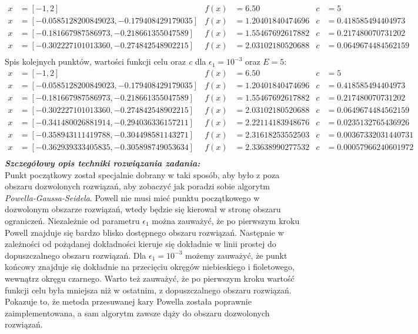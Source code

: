 \documentclass[a4paper,12pt]{article}
\begin{document}
\begin{align*}
x &= [-1, 2] & 
f(x) &= 6.50 &
c &= 5 \\
x &= [-0.0585128200849023, -0.179408429179035] & 
f(x) &= 1.20401840474696 &
c &= 0.418585494404973 \\
x &= [-0.181667987586973, -0.218661355047589] & 
f(x) &= 1.55467692617882 &
c &= 0.217480070731202 \\
x &= [-0.302227101013360, -0.274842548902215] & 
f(x) &= 2.03102180520688 &
c &= 0.0649674484562159 \\
\end{align*}
Spis kolejnych punktów, wartości funkcji celu oraz \textit{c}  dla $\epsilon_{1} = 10^{-3}$ oraz $E = 5$:
\begin{align*}
x &= [-1, 2] & 
f(x) &= 6.50 &
c &= 5 \\
x &= [-0.0585128200849023, -0.179408429179035] & 
f(x) &= 1.20401840474696 &
c &= 0.418585494404973 \\
x &= [-0.181667987586973, -0.218661355047589] & 
f(x) &= 1.55467692617882 &
c &= 0.217480070731202 \\
x &= [-0.302227101013360, -0.274842548902215] & 
f(x) &= 2.03102180520688 &
c &= 0.0649674484562159 \\
x &= [-0.341480026881914, -0.294036336157211] & 
f(x) &= 2.22114183948676 &
c &= 0.0235132765436926 \\
x &= [-0.358943111419788, -0.304498581143271] & 
f(x) &= 2.31618253552503 &
c &= 0.00367332031440731 \\
x &= [-0.362939333405835, -0.305898749053634] & 
f(x) &= 2.33638990277532 &
c &= 0.00057966240601972 \\
\end{align*}
\textbf{\textit{Szczegółowy opis techniki rozwiązania zadania:}} \\
Punkt początkowy został specjalnie dobrany w taki sposób, aby było z poza obszaru dozwolonych rozwiązań, aby zobaczyć jak poradzi sobie algorytm \textit{Powella-Gaussa-Seidela}. Powell nie musi mieć punktu początkowego w dozwolonym obszarze rozwiązań, wtedy będzie się kierował w stronę obszaru ograniczeń. Niezależnie od parametru $\epsilon_{1}$ można zauważyć, że po pierwszym kroku Powell znajduje się bardzo blisko dostępnego obszaru rozwiązań. Następnie w zależności od pożądanej dokładności kieruje się dokładnie w linii prostej do dopuszczalnego obszaru rozwiązań. Dla $\epsilon_{1} = 10^{-3}$ możemy zauważyć, że punkt końcowy znajduje się dokładnie na przecięciu okręgów niebieskiego i fioletowego, wewnątrz okręgu czarnego. Warto też zauważyć, że po pierwszym kroku wartość funkcji celu była mniejsza niż w ostatnim, z dopuszczalnego obszaru rozwiązań. Pokazuje to, że metoda przesuwanej kary Powella została poprawnie zaimplementowana, a sam algorytm zawsze dąży do obszaru dozwolonych rozwiązań. 
\end{document}

